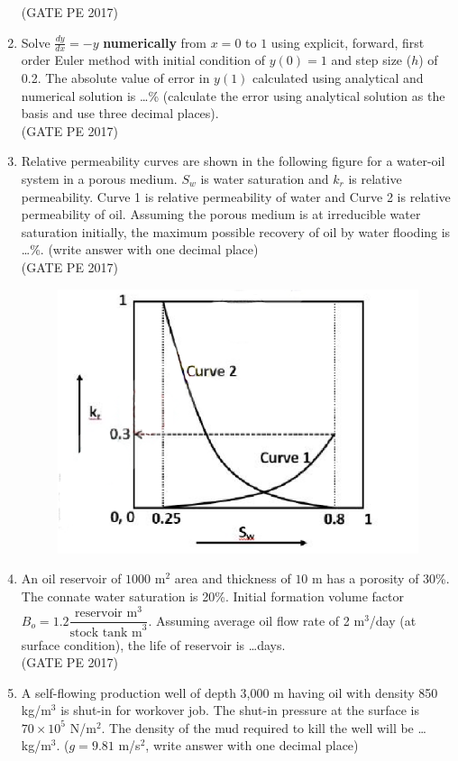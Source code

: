 \documentclass[journal,12pt,onecolumn]{IEEEtran}
\theoremstyle{remark}
\begin{document}
\begin{enumerate}
\hfill{(GATE PE 2017)}

\item Solve $ \frac{dy}{dx} = -y$ \textbf{numerically} from $x = 0$ to $1$ using explicit, forward, first order Euler method with initial condition of $y(0) = 1$ and step size ($h$) of 0.2. The absolute value of error in $y(1)$ calculated using analytical and numerical solution is \dots \% (calculate the error using analytical solution as the basis and use three decimal places).\\

\hfill{(GATE PE 2017)}

\item Relative permeability curves are shown in the following figure for a water-oil system in a porous medium. $S_w$ is water saturation and $k_r$ is relative permeability. Curve 1 is relative permeability of water and Curve 2 is relative permeability of oil.
Assuming the porous medium is at irreducible water saturation initially, the maximum possible recovery of oil by water flooding is \dots \%. (write answer with one decimal place)\\

\hfill{(GATE PE 2017)}
\begin{figure}[h]
    \centering
    \includegraphics[width=0.5\columnwidth]{GraphQ_29.png}
    \caption{}
    \label{fig:placeholder}
\end{figure}

\item An oil reservoir of $1000$ m$^2$ area and thickness of $10$ m has a porosity of 30\%. The connate water saturation is 20\%. Initial formation volume factor $B_o = 1.2 \dfrac{\text{reservoir m}^3}{\text{stock tank m}^3}$. Assuming average oil flow rate of 2 m$^3$/day (at surface condition), the life of reservoir is \dots days.\\

\hfill{(GATE PE 2017)}

\item A self-flowing production well of depth 3,000 m having oil with density 850 kg/m$^3$ is shut-in for workover job. The shut-in pressure at the surface is $70 \times 10^5$ N/m$^2$. The density of the mud required to kill the well will be \dots kg/m$^3$. ($g = 9.81$ m/s$^2$, write answer with one decimal place)\\


\end{enumerate}
\end{document}
